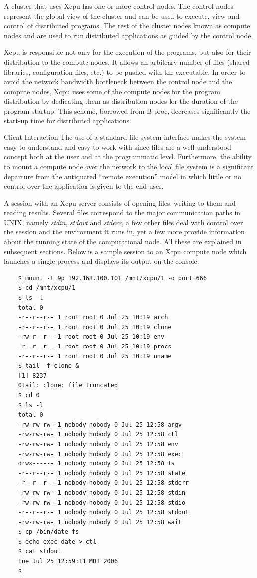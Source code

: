 \documentclass[11pt]{p9article}
\makeatletter
\renewcommand\section{\@startsection {section}{1}{\z@} {3pt} {1pt} {\normalfont\normalsize\bfseries}}
\makeatother
\begin{document}
A cluster that uses Xcpu has one or more control nodes. The control
nodes represent the global view of the cluster and can be used to
execute, view and control of distributed programs. The rest of the
cluster nodes known as compute nodes and are used to run distributed
applications as guided by the control node.

Xcpu is responsible not only for the execution of the programs, but
also for their distribution to the compute nodes. It allows an
arbitrary number of files (shared libraries, configuration files, etc.)
to be pushed with the executable. In order to avoid the network
bandwidth bottleneck between the control node and the compute nodes,
Xcpu uses some of the compute nodes for the program distribution
by dedicating them as distribution nodes for the duration of the
program startup. This scheme, borrowed from B-proc, decreases
significantly the start-up time for distributed applications.

\section{Client Interaction}
The use of a standard file-system interface makes the system easy
to understand and easy to work with since
files are a well understood concept both at the user and at the
programmatic level. Furthermore, the ability to mount a compute
node over the network to the local file system is a significant
departure from the antiquated ``remote execution'' model in which
little or no control over the application is given to the end user.

A session with an Xcpu server consists of opening files, writing
to them and reading results. Several files correspond to the major
communication paths in UNIX, namely \textsl{stdin}, \textsl{stdout}
and \textsl{stderr}, a few other files deal with control over the
session and the environment it runs in, yet a few more provide information about the running
state of the computational node. All these are explained in subsequent
sections.  Below is a sample session to an Xcpu compute node which launches
a single process and displays its output on the console:
\begin{verbatim}
	$ mount -t 9p 192.168.100.101 /mnt/xcpu/1 -o port=666
	$ cd /mnt/xcpu/1
	$ ls -l
	total 0
	-r--r--r-- 1 root root 0 Jul 25 10:19 arch
	-r--r--r-- 1 root root 0 Jul 25 10:19 clone
	-rw-r--r-- 1 root root 0 Jul 25 10:19 env
	-r--r--r-- 1 root root 0 Jul 25 10:19 procs
	-r--r--r-- 1 root root 0 Jul 25 10:19 uname
	$ tail -f clone &
	[1] 8237
	0tail: clone: file truncated
	$ cd 0
	$ ls -l
	total 0
	-rw-rw-rw- 1 nobody nobody 0 Jul 25 12:58 argv
	-rw-rw-rw- 1 nobody nobody 0 Jul 25 12:58 ctl
	-rw-rw-rw- 1 nobody nobody 0 Jul 25 12:58 env
	-rw-rw-rw- 1 nobody nobody 0 Jul 25 12:58 exec
	drwx------ 1 nobody nobody 0 Jul 25 12:58 fs
	-r--r--r-- 1 nobody nobody 0 Jul 25 12:58 state
	-r--r--r-- 1 nobody nobody 0 Jul 25 12:58 stderr
	-rw-rw-rw- 1 nobody nobody 0 Jul 25 12:58 stdin
	-rw-rw-rw- 1 nobody nobody 0 Jul 25 12:58 stdio
	-r--r--r-- 1 nobody nobody 0 Jul 25 12:58 stdout
	-rw-rw-rw- 1 nobody nobody 0 Jul 25 12:58 wait
	$ cp /bin/date fs
	$ echo exec date > ctl
	$ cat stdout 
	Tue Jul 25 12:59:11 MDT 2006
	$
\end{verbatim}
\end{document}
